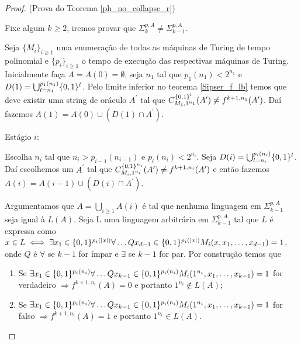 \begin{proof} (Prova do Teorema \ref{ph_no_collapse_r})

Fixe algum $k \geq 2$, iremos provar que $\Sigma_{k}^{p, A} \neq \Sigma_{k - 1}^{p, A}$.

Seja $\{M_{i}\}_{i \geq 1}$ uma enumeração de todas as máquinas de Turing de tempo polinomial e $\{p_{i}\}_{i \geq 1}$ o tempo de execução das respectivas máquinas de Turing. Inicialmente faça $A = A(0) = \emptyset$, seja $n_{1}$ tal que $p_{1}(n_{1}) < 2^{n_{1}}$ e $D(1) = \bigcup_{l = n_{1}}^{p_{1}(n_{1})} \{0, 1\}^{l}$. Pelo limite inferior no teorema \ref{Sipser_f_lb} temos que deve existir uma string de oráculo $A^{\prime}$ tal que $C_{M_{1}, 1^{n_{1}}}^{\{0, 1\}^{l}}(A^{\prime}) \neq f^{k + 1, n_{1}}(A^{\prime})$. Daí fazemos $A(1) = A(0) \cup (D(1) \cap A^{\prime})$.

Estágio $i$:

Escolha $n_{i}$ tal que $n_{i} > p_{i - 1}(n_{i - 1})$ e $p_{i}(n_{i}) < 2^{n_{i}}$. Seja $D(i) = \bigcup_{l = n_{i}}^{p_{i}(n_{i})}\{0, 1\}^{l}$. Daí escolhemos um $A^{\prime}$ tal que $C_{M_{i}, 1^{n_{i}}}^{\{0, 1\}^{n_{i}}}(A^{\prime}) \neq f^{k + 1, n_{i}}(A^{\prime})$ e então fazemos $A(i) = A(i - 1) \cup (D(i) \cap A^{\prime})$.

Argumentamos que $A = \bigcup_{i \geq 1}A(i)$ é tal que nenhuma linguagem em $\Sigma_{k - 1}^{p, A}$ seja igual à $L(A)$. Seja L uma linguagem arbitrária em $\Sigma_{k - 1}^{p, A}$ tal que $L$ é expressa como $x \in L \iff \exists x_{1} \in \{0, 1\}^{p_{i}(\lvert x \rvert)}\forall \dots Q x_{d - 1 } \in \{0, 1\}^{p_{i}(\lvert x \rvert)} M_{i}(x, x_{1}, \dots, x_{d - 1}) = 1$, onde $Q$ é $\forall$ se $k - 1$ for ímpar e $\exists$ se $k - 1$ for par. Por construção temos que

\begin{enumerate}

	\item Se $\exists x_{1} \in \{0, 1\}^{p_{i}(n_{i})} \forall \dots Q x_{k - 1} \in \{0, 1\}^{p_{i}(n_{i})} M_{i}(1^{n_{i}}, x_{1}, \dots, x_{k - 1}) = 1$ for verdadeiro $\Rightarrow f^{k + 1, n_{i}}(A) = 0$ e portanto $1^{n_{i}} \not\in L(A)$;
	
	\item Se  $\exists x_{1} \in \{0, 1\}^{p_{i}(n_{i})} \forall \dots Q x_{k - 1} \in \{0, 1\}^{p_{i}(n_{i})} M_{i}(1^{n_{i}}, x_{1}, \dots, x_{k - 1}) = 1$ for falso $\Rightarrow f^{k + 1, n_{i}}(A) = 1$ e portanto $1^{n_{i}} \in L(A)$.

\end{enumerate}


\end{proof}
